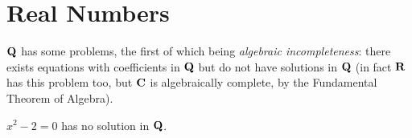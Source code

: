 \begin{comment}
\begin{notation}
Since the additive inverse is unique, we denote the additive inverse of $q\in\QQ$ by $-q$; we define the binary operation $-_\QQ$ on $\QQ$ by
\[q-_\QQ r=q+_\QQ(-r).\]
\end{notation}

\begin{notation}
Since the multiplicative inverse is unique, we denote the additive inverse of $q\in\QQ$ by $q^{-1}$.
\end{notation}

Finally we want to define an order relation on $\QQ$.
\begin{definition}[Order on $\QQ$]
Suppose that $r,s\in\QQ$ and that $r=[(a,b)]$ and $s=[(c,d)]$, where $b,d>0$. Then
\[r\le_\QQ s\iff ad<bc.\]
\end{definition}

\begin{proposition}
$<_\QQ$ is well-defined.
\end{proposition}

\begin{definition}
If $q\in\QQ$, then
\begin{itemize}
\item $q$ is \vocab{positive} if and only if $0_\QQ<_\QQ q$,
\item $q$ is \vocab{negative} if and only if $q<_\QQ0_\QQ$.
\end{itemize}
\end{definition}

\begin{definition}
If $q\in\QQ$, then the \vocab{absolute value} of $q$ is
\[|q|=\begin{cases}
-q&\text{if $q$ is negative,}\\
q&\text{if otherwise.}
\end{cases}\]
\end{definition}
\pagebreak
\end{comment}

\section{Real Numbers}
$\mathbf Q$ has some problems, the first of which being \emph{algebraic incompleteness}: there exists equations with coefficients in $\mathbf Q$ but do not have solutions in $\mathbf Q$ (in fact $\mathbf R$ has this problem too, but $\mathbf C$ is algebraically complete, by the Fundamental Theorem of Algebra).

\begin{lemma*}
$x^2-2=0$ has no solution in $\mathbf Q$.
\end{lemma*}

